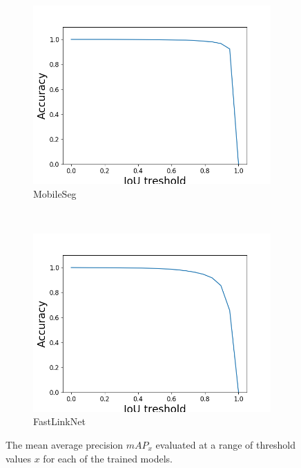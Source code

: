 \documentclass{kththesis}
\begin{document}
\begin{figure}[h]
    \begin{subfigure}[b]{0.45\textwidth}
        \includegraphics[width=\textwidth]{MobileSeg_test_AP}
        \caption{MobileSeg}
        \label{fig:AP_MobileSeg}
    \end{subfigure}
    ~ %
    \begin{subfigure}[b]{0.45\textwidth}
        \includegraphics[width=\textwidth]{FastLinkNet3_test_AP}
        \caption{FastLinkNet}
        \label{fig:AP_FastLinkNet}
    \end{subfigure}
    \caption{The mean average precision \(mAP_x\) evaluated at a range of
      threshold values \(x\) for each of the trained models.}\label{fig:AP}
\end{figure}
\end{document}
